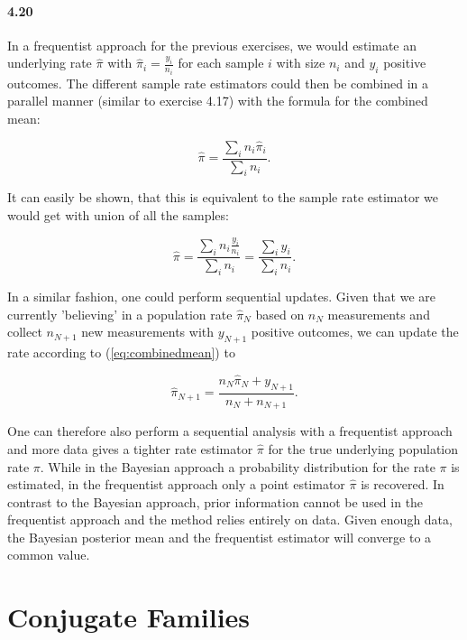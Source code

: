 \documentclass[fontsize=11pt,DIV=18,parskip=half]{scrartcl}
\begin{document}
\paragraph{4.20} 

In a frequentist approach for the previous exercises, we would estimate an underlying rate $\hat{\pi}$ with $\hat{\pi}_i = \frac{y_i}{n_i}$ for each sample $i$ with size $n_i$ and $y_i$ positive outcomes. The different sample rate estimators could then be combined in a parallel manner (similar to exercise 4.17) with the formula for the combined mean:

\begin{equation}
\label{eq:combinedmean}
\hat{\pi} = \frac{\displaystyle{\sum_i n_i \hat{\pi}_i} }{\displaystyle{\sum_i n_i}}.
\end{equation}

It can easily be shown, that this is equivalent to the sample rate estimator we would get with union of all the samples:

\begin{equation*}
\hat{\pi} = \frac{\displaystyle{\sum_i n_i \frac{y_i}{n_i} } }{\displaystyle{\sum_i n_i}} = \frac{\displaystyle{\sum_i y_i } }{\displaystyle{\sum_i n_i}}.
\end{equation*}

In a similar fashion, one could perform sequential updates. Given that we are currently 'believing' in a population rate $\hat{\pi}_N$ based on $n_N$ measurements and collect $n_{N+1}$ new measurements with $y_{N+1}$ positive outcomes, we can update the rate according to (\ref{eq:combinedmean}) to

\begin{equation*}
\hat{\pi}_{N+1} = \frac{n_N \hat{\pi}_N + y_{N+1}}{n_N + n_{N+1}}.
\end{equation*}

One can therefore also perform a sequential analysis with a frequentist approach and more data gives a tighter rate estimator $\hat{\pi}$ for the true underlying population rate $\pi$. While in the Bayesian approach a probability distribution for the rate $\pi$ is estimated, in the frequentist approach only a point estimator $\hat{\pi}$ is recovered. In contrast to the Bayesian approach, prior information cannot be used in the frequentist approach and the method relies entirely on data. Given enough data, the Bayesian posterior mean and the frequentist estimator will converge to a common value.

\section{Conjugate Families}
\end{document}
